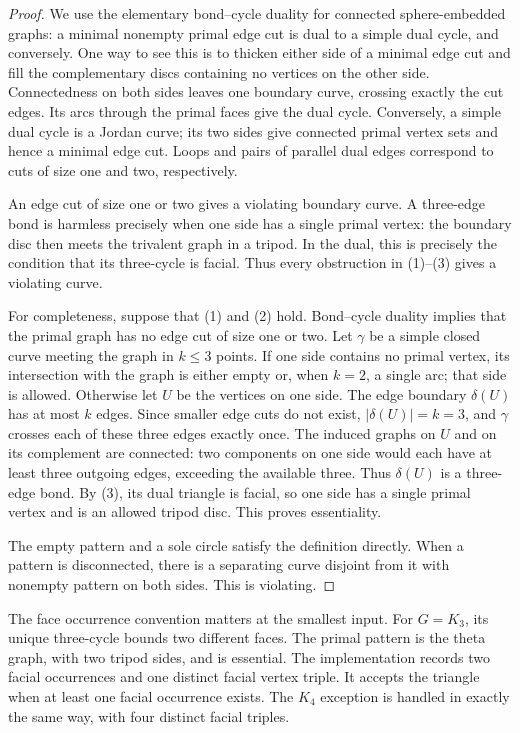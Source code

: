 \begin{proof}
We use the elementary bond--cycle duality for connected sphere-embedded
graphs: a minimal nonempty primal edge cut is dual to a simple dual cycle,
and conversely.  One way to see this is to thicken either side of a
minimal edge cut and fill the complementary discs containing no vertices
on the other side.  Connectedness on both sides leaves one boundary
curve, crossing exactly the cut edges.  Its arcs through the primal
faces give the dual cycle.  Conversely, a simple dual cycle is a Jordan
curve; its two sides give connected primal vertex sets and hence a
minimal edge cut.  Loops and pairs of parallel dual edges correspond to
cuts of size one and two, respectively.

An edge cut of size one or two gives a violating boundary curve.  A
three-edge bond is harmless precisely when one side has a single primal
vertex: the boundary disc then meets the trivalent graph in a tripod.
In the dual, this is precisely the condition that its three-cycle is
facial.  Thus every obstruction in (1)--(3) gives a violating curve.

For completeness, suppose that (1) and (2) hold.  Bond--cycle duality
implies that the primal graph has no edge cut of size one or two.  Let
$\gamma$ be a simple closed curve meeting the graph in $k\leq3$ points.
If one side contains no primal vertex, its intersection with the graph
is either empty or, when $k=2$, a single arc; that side is allowed.
Otherwise let $U$ be the vertices on one side.  The edge boundary
$\delta(U)$ has at most $k$ edges.  Since smaller edge cuts do not exist,
$|\delta(U)|=k=3$, and $\gamma$ crosses each of these three edges exactly
once.  The induced graphs on $U$ and on its complement are connected:
two components on one side would each have at least three outgoing
edges, exceeding the available three.  Thus $\delta(U)$ is a
three-edge bond.  By (3), its dual triangle is facial, so one side has a
single primal vertex and is an allowed tripod disc.  This proves
essentiality.

The empty pattern and a sole circle satisfy the definition directly.
When a pattern is disconnected, there is a separating curve disjoint
from it with nonempty pattern on both sides.  This is violating.
\end{proof}

The face occurrence convention matters at the smallest input.  For
$G=K_3$, its unique three-cycle bounds two different faces.  The primal
pattern is the theta graph, with two tripod sides, and is essential.
The implementation records two facial occurrences and one distinct
facial vertex triple.  It accepts the triangle when at least one facial
occurrence exists.  The $K_4$ exception is handled in exactly the same
way, with four distinct facial triples.

